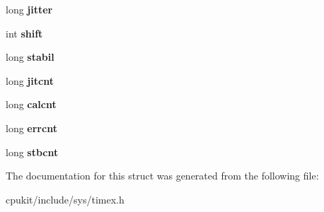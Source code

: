 \begin{DoxyCompactItemize}
long {\bfseries jitter}
\item 
\mbox{\label{structtimex_a3c181bdab2180e3cb2076e2443b25346}} 
int {\bfseries shift}
\item 
\mbox{\label{structtimex_a985a6d1a8515d0bb7db8f1e85e9a4b19}} 
long {\bfseries stabil}
\item 
\mbox{\label{structtimex_acd9fe2ddfedca8520e30cae809af4f92}} 
long {\bfseries jitcnt}
\item 
\mbox{\label{structtimex_a3bbefe4719e9439ce5f73cc079fff7c1}} 
long {\bfseries calcnt}
\item 
\mbox{\label{structtimex_a143001c1024fd7981afa2b9ea4b1bf5e}} 
long {\bfseries errcnt}
\item 
\mbox{\label{structtimex_a7490abd8d9c2bbbba00493e72813cf28}} 
long {\bfseries stbcnt}
\end{DoxyCompactItemize}


The documentation for this struct was generated from the following file\+:\begin{DoxyCompactItemize}
\item 
cpukit/include/sys/timex.\+h\end{DoxyCompactItemize}

